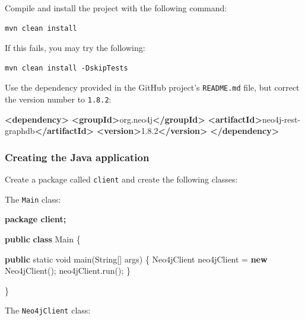 \documentclass[]{report}
\newenvironment{Shaded}{}{}
\newcommand{\KeywordTok}[1]{\textcolor[rgb]{0.00,0.44,0.13}{\textbf{{#1}}}}
\newcommand{\DataTypeTok}[1]{\textcolor[rgb]{0.56,0.13,0.00}{{#1}}}
\newcommand{\FunctionTok}[1]{\textcolor[rgb]{0.02,0.16,0.49}{{#1}}}
\newcommand{\NormalTok}[1]{{#1}}
\begin{document}
Compile and install the project with the following command:

\begin{verbatim}
mvn clean install
\end{verbatim}

If this fails, you may try the following:

\begin{verbatim}
mvn clean install -DskipTests
\end{verbatim}

Use the dependency provided in the GitHub project's \texttt{README.md}
file, but correct the version number to \texttt{1.8.2}:

\begin{Shaded}
\begin{Highlighting}[]
\KeywordTok{<dependency>}
    \KeywordTok{<groupId>}\NormalTok{org.neo4j}\KeywordTok{</groupId>}
    \KeywordTok{<artifactId>}\NormalTok{neo4j-rest-graphdb}\KeywordTok{</artifactId>}
    \KeywordTok{<version>}\NormalTok{1.8.2}\KeywordTok{</version>}
\KeywordTok{</dependency>}
\end{Highlighting}
\end{Shaded}

\subsubsection{Creating the Java application}

Create a package called \texttt{client} and create the following
classes:

The \texttt{Main} class:

\begin{Shaded}
\begin{Highlighting}[]
\KeywordTok{package client;}

\KeywordTok{public} \KeywordTok{class} \NormalTok{Main \{}

    \KeywordTok{public} \DataTypeTok{static} \DataTypeTok{void} \FunctionTok{main}\NormalTok{(String[] args) \{}
        \NormalTok{Neo4jClient neo4jClient = }\KeywordTok{new} \FunctionTok{Neo4jClient}\NormalTok{();}
        \NormalTok{neo4jClient.}\FunctionTok{run}\NormalTok{();}
    \NormalTok{\}}
    
\NormalTok{\}}
\end{Highlighting}
\end{Shaded}

The \texttt{Neo4jClient} class:
\end{document}
